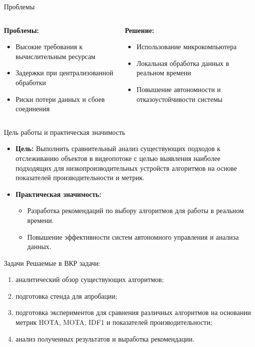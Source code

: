 \documentclass{beamer} %
\begin{document}
\begin{frame}{Проблемы}
  \begin{columns}[T]
    \begin{column}{0.45\textwidth}
      \textbf{Проблемы:}
      \begin{itemize}
        \item Высокие требования к вычислительным ресурсам
        \item Задержки при централизованной обработки
        \item Риски потери данных и сбоев соединения
      \end{itemize}
    \end{column}
    \begin{column}{0.45\textwidth}
      \textbf{Решение:}
      \begin{itemize}
        \item Использование микрокомпьютера
        \item Локальная обработка данных в реальном времени
        \item Повышение автономности и отказоустойчивости системы
      \end{itemize}
    \end{column}
  \end{columns}
\end{frame}

\begin{frame}{Цель работы и практическая значимость}
  \begin{itemize}
    \item \textbf{Цель:} Выполнить сравнительный анализ существующих подходов к отслеживанию объектов в
    видеопотоке с целью выявления наиболее подходящих для низкопроизводительных
    устройств алгоритмов на основе показателей производительности и метрик.
    \item \textbf{Практическая значимость:}
      \begin{itemize}
        \item Разработка рекомендаций по выбору алгоритмов для работы в реальном времени.
        \item Повышение эффективности систем автономного управления и анализа данных.
      \end{itemize}
  \end{itemize}
\end{frame}

\begin{frame}{Задачи}
  Решаемые в ВКР задачи:
  \begin{enumerate}
    \item аналитический обзор существующих алгоритмов;
    \item подготовка стенда для апробации;
    \item подготовка экспериментов для сравнения различных алгоритмов на основании метрик HOTA, MOTA, IDF1 и показателей производительности;
    \item анализ полученных результатов и выработка рекомендации.
\end{enumerate}
\end{frame}
\end{document}
